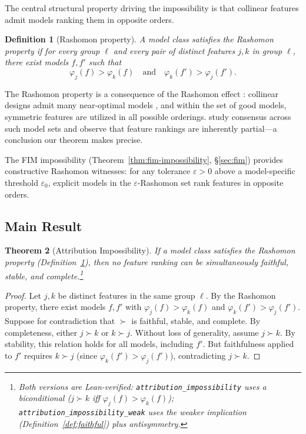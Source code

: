 \documentclass{article}
\newtheorem{theorem}{Theorem}
\newtheorem{definition}[theorem]{Definition}
\begin{document}
The central structural property driving the impossibility is that collinear features admit models ranking them in opposite orders.

\begin{definition}[Rashomon property]
\label{def:rashomon}
A model class satisfies the \emph{Rashomon property} if for every group $\ell$ and every pair of distinct features $j, k$ in group $\ell$, there exist models $f, f'$ such that
\[
    \varphi_j(f) > \varphi_k(f) \quad \text{and} \quad \varphi_k(f') > \varphi_j(f').
\]
\end{definition}

\begin{sloppypar}
The Rashomon property is a consequence of the Rashomon effect
\citep{rudin2024amazing,fisher2019models}: collinear designs admit many near-optimal
models \citep{damour2022underspecification}, and within the set of good models,
symmetric features are utilized in all possible orderings.
\citet{laberge2023partial} study consensus across such model sets and observe that
feature rankings are inherently partial---a conclusion our theorem makes precise.
\end{sloppypar}

The FIM impossibility (Theorem~\ref{thm:fim-impossibility}, \S\ref{sec:fim}) provides constructive Rashomon witnesses: for any tolerance $\varepsilon > 0$ above a model-specific threshold $\varepsilon_0$, explicit models in the $\varepsilon$-Rashomon set rank features in opposite orders.

\subsection{Main Result}
\label{sec:main-result}

\begin{theorem}[Attribution Impossibility]
\label{thm:impossibility}
If a model class satisfies the Rashomon property (Definition~\ref{def:rashomon}),
then no feature ranking can be simultaneously faithful, stable, and
complete.\footnote{Both versions are Lean-verified:
\texttt{attribution\allowbreak\_impossibility} uses a biconditional
($j \succ k$ iff $\varphi_j(f) > \varphi_k(f)$);
\texttt{attribution\allowbreak\_impossibility\allowbreak\_weak} uses the weaker
implication (Definition~\ref{def:faithful}) plus antisymmetry.}
\end{theorem}

\begin{proof}
Let $j, k$ be distinct features in the same group $\ell$.
By the Rashomon property, there exist models $f, f'$ with $\varphi_j(f) > \varphi_k(f)$ and $\varphi_k(f') > \varphi_j(f')$.
Suppose for contradiction that $\succ$ is faithful, stable, and complete.
By completeness, either $j \succ k$ or $k \succ j$.
Without loss of generality, assume $j \succ k$.
By stability, this relation holds for all models, including $f'$.
But faithfulness applied to $f'$ requires $k \succ j$ (since $\varphi_k(f') > \varphi_j(f')$), contradicting $j \succ k$.
\end{proof}
\end{document}
